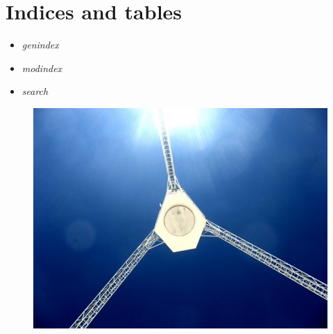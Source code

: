 \documentclass[letterpaper,10pt,english]{sphinxmanual}
\begin{document}
\chapter{Indices and tables}
\label{index:indices-and-tables}\begin{itemize}
\item {} 
\emph{genindex}

\item {} 
\emph{modindex}

\item {} 
\emph{search}

\end{itemize}
\begin{figure}[htbp]
\centering

\includegraphics{parkes_focus.jpg}
\end{figure}



\renewcommand{\indexname}{Index}
\printindex
\end{document}
